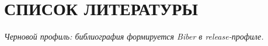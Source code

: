 \documentclass[14pt,a4paper]{extreport}
\newcommand{\printbibliography}[1][]{\chapter*{СПИСОК ЛИТЕРАТУРЫ}\textit{Черновой профиль: библиография формируется Biber в release-профиле.}}
\begin{document}


\tableofcontents










\printbibliography[title={СПИСОК ЛИТЕРАТУРЫ}]
\appendix

\end{document}

